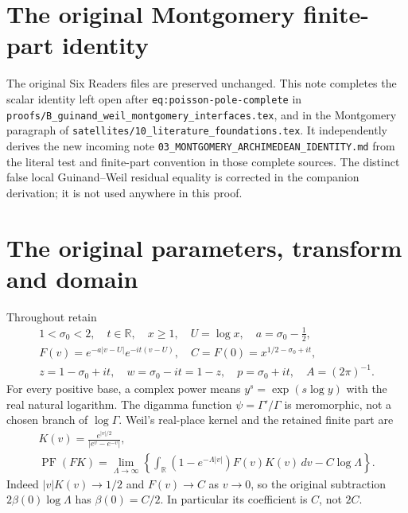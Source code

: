 \clearpage
\begingroup
\def\R{\mathbb R}
\def\C{\mathbb C}
\def\PF{\operatorname{PF}}
\def\dd{\,d}

\setcounter{equation}{0}
\renewcommand{\theequation}{A03MA.\arabic{equation}}
\section*{The original Montgomery finite-part identity}

\noindent The original Six Readers files are preserved unchanged. This note
completes the scalar identity left open after
\texttt{eq:poisson-pole-complete} in
\nolinkurl{proofs/B_guinand_weil_montgomery_interfaces.tex}, and in the
Montgomery paragraph of
\texttt{satellites/10\_literature\_foundations.tex}.
It independently derives the new incoming note
\texttt{03\_MONTGOMERY\_ARCHIMEDEAN\_IDENTITY.md} from the literal test and
finite-part convention in those complete sources. The distinct false local
Guinand--Weil residual equality is corrected in the companion derivation;
it is not used anywhere in this proof.

\section{The original parameters, transform and domain}
Throughout retain
\begin{equation}\tag{MA1}\begin{gathered}
 1<\sigma_0<2,\quad t\in\R,\quad x\ge1,\quad U=\log x,\quad
 a=\sigma_0-\tfrac12,\\
 F(v)=e^{-a|v-U|}e^{-it(v-U)},\quad
 C=F(0)=x^{1/2-\sigma_0+it},\\
 z=1-\sigma_0+it,\quad w=\sigma_0-it=1-z,\quad
 p=\sigma_0+it,\quad A=(2\pi)^{-1}.
\end{gathered}\end{equation}
For every positive base, a complex power means $y^s=\exp(s\log y)$ with
the real natural logarithm. The digamma function $\psi=\Gamma'/\Gamma$
is meromorphic, not a chosen branch of $\log\Gamma$.
Weil's real-place kernel and the retained finite part \cite{a03ma:Weil} are
\begin{equation}\tag{MA2}\begin{gathered}
 K(v)=\frac{e^{|v|/2}}{|e^v-e^{-v}|},\\
 \PF(FK)=\lim_{\Lambda\to\infty}
 \left\{\int_\R(1-e^{-\Lambda|v|})F(v)K(v)\dd v-C\log\Lambda\right\}.
\end{gathered}\end{equation}
Indeed $|v|K(v)\to1/2$ and $F(v)\to C$ as $v\to0$, so the original
subtraction $2\beta(0)\log\Lambda$ has $\beta(0)=C/2$. In particular its
coefficient is $C$, not $2C$.

